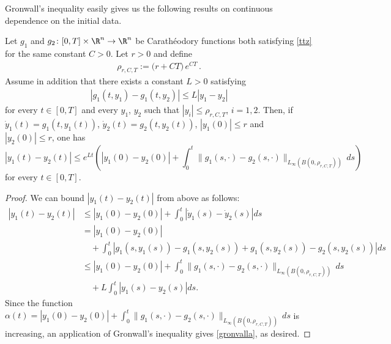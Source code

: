 Gronwall's inequality easily gives us the following results on continuous dependence on the initial data.

\begin{lemma}\label{le:uniquecara}
Let $g_1$ and $g_2\colon[0,T]\times \R^n \to \R^n$ be Carath{\'e}odory functions both satisfying \eqref{ttz} for the same  constant $C > 0$. Let $r>0$ and define 
\begin{align*}
\rho_{r, C, T}:=\Big(r+ CT\Big) \,e^{CT}\,.
\end{align*}
Assume in addition that there exists a constant $L > 0$ satisfying
\begin{align*}
|g_1(t, y_1)-g_1(t, y_2)|\le L|y_1-y_2|
\end{align*}
for every $t \in [0, T]$ and every $y_1$, $y_2$ such that $|y_i|\le \rho_{r, C, T}$, $i=1,2$.
Then, if $\dot y_1(t)=g_1(t, y_1(t))$, $\dot y_2(t)=g_2(t, y_2(t))$, $|y_1(0)|\le r$ and $|y_2(0)|\le r$, one has
\begin{equation}\label{gronvalla}
|y_1(t)-y_2(t)|\le e^{Lt}\left(|y_1(0)-y_2(0)|+\int_0^t \|g_1(s, \cdot)-g_2(s, \cdot)\|_{L_\infty(B(0, \rho_{r, C, T}))} \,ds \right)
\end{equation}
for every $t \in [0, T]$.
\end{lemma}
\begin{proof}
We can bound $|y_1(t) - y_2(t)|$ from above as follows:
\begin{align*}
|y_1(t) - y_2(t)| &\leq |y_1(0) - y_2(0)| + \int^t_0 |\dot{y}_1(s) - \dot{y}_2(s)| ds \\
&= |y_1(0) - y_2(0)| \\
& \quad + \int^t_0 |g_1(s, y_1(s)) - g_1(s, y_2(s)) + g_1(s, y_2(s)) - g_2(s, y_2(s))| ds \\
& \leq |y_1(0) - y_2(0)| + \int_0^t \|g_1(s, \cdot)-g_2(s, \cdot)\|_{L_\infty(B(0, \rho_{r, C, T}))} \,ds \\
& \quad  + L \int^t_0|y_1(s) - y_2(s)| ds.
\end{align*}
Since the function $\alpha(t) = |y_1(0) - y_2(0)| + \int_0^t \|g_1(s, \cdot)-g_2(s, \cdot)\|_{L_\infty(B(0, \rho_{r, C, T}))} \,ds$ is increasing, an application of Gronwall's inequality gives \eqref{gronvalla}, as desired.
\end{proof}



